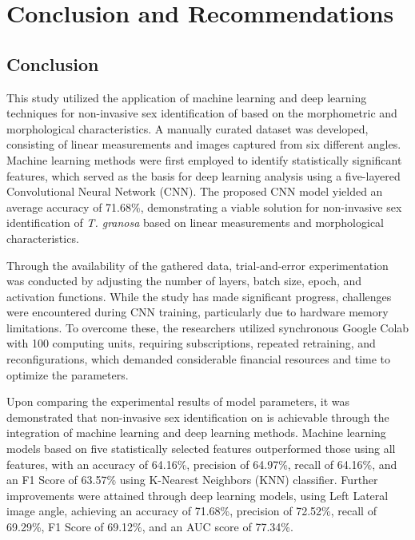 \chapter{Conclusion and Recommendations}


\section{Conclusion}

This study utilized the application of machine learning and deep learning techniques for non-invasive sex identification of \Tgranosa based on the morphometric and morphological characteristics. A manually curated dataset was developed, consisting of linear measurements and images captured from six different angles. Machine learning methods were first employed to identify statistically significant features, which served as the basis for deep learning analysis using a five-layered Convolutional Neural Network (CNN). The proposed CNN model yielded an average accuracy of 71.68\%, demonstrating a viable solution for non-invasive sex identification of  \textit{T. granosa} based on linear measurements and morphological characteristics.

Through the availability of the gathered data, trial-and-error experimentation was conducted by adjusting the number of layers, batch size, epoch, and activation functions. While the study has made significant progress, challenges were encountered during CNN training, particularly due to hardware memory limitations. To overcome these, the researchers utilized synchronous Google Colab with 100 computing units, requiring subscriptions, repeated retraining, and reconfigurations, which demanded considerable financial resources and time to optimize the parameters. 

Upon comparing the experimental results of model parameters, it was demonstrated that non-invasive sex identification on \Tgranosa is achievable through the integration of machine learning and deep learning methods. Machine learning models based on five statistically selected features outperformed those using all features, with an accuracy of 64.16\%, precision of 64.97\%, recall of 64.16\%, and an F1 Score of 63.57\% using K-Nearest Neighbors (KNN) classifier. Further improvements were attained through deep learning models, using Left Lateral image angle, achieving an accuracy of 71.68\%, precision of 72.52\%, recall of 69.29\%, F1 Score of 69.12\%, and an AUC score of 77.34\%. 

